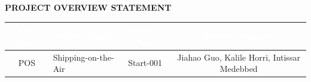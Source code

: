 \documentclass[12pt, a4paper]{article}
\begin{document}
\begin{center}
    \Large \textbf{PROJECT OVERVIEW STATEMENT}
\end{center}
\vspace{0.5cm}

\noindent
\begin{tabularx}{\textwidth}{|c|X|c|c|}
    \hline
    \rowcolor{headerblue}
    \textcolor{white}{\textbf{Doc Type}} & \textcolor{white}{\textbf{Project Name}} & \textcolor{white}{\textbf{Project No.}} & \textcolor{white}{\textbf{Project Manager}} \\
    \hline
    POS & Shipping-on-the-Air & Start-001 & Jiahao Guo, Kalile Horri, Intissar Medebbed \\
    \hline
\end{tabularx}

\vspace{1cm}
\end{document}
